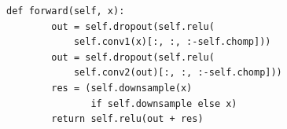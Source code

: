 \documentclass[
    12pt,
    openright,
    oneside,
    a4paper,
    english,
    brazil
]{abntex2}
\begin{document}
\begin{apendicesenv}
\begin{lstlisting}[caption={Bloco convolucional causal da TCN.},label={lst:tcn}]
    def forward(self, x):
        out = self.dropout(self.relu(
            self.conv1(x)[:, :, :-self.chomp]))
        out = self.dropout(self.relu(
            self.conv2(out)[:, :, :-self.chomp]))
        res = (self.downsample(x)
               if self.downsample else x)
        return self.relu(out + res)
\end{lstlisting}

\end{apendicesenv}
\end{document}
